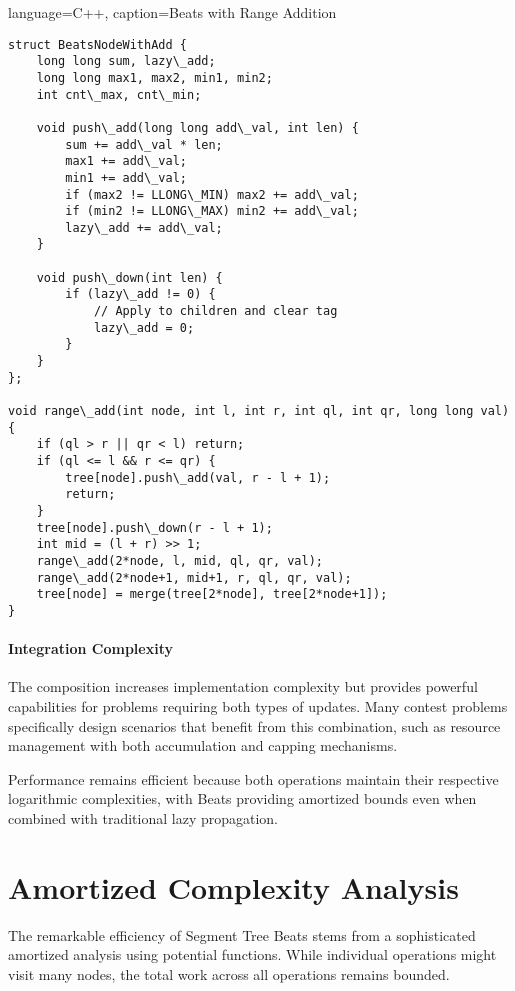 \begin{marginlisting}[0pt]{language=C++, caption=Beats with Range Addition}
\begin{lstlisting}
struct BeatsNodeWithAdd {
    long long sum, lazy\_add;
    long long max1, max2, min1, min2;
    int cnt\_max, cnt\_min;
    
    void push\_add(long long add\_val, int len) {
        sum += add\_val * len;
        max1 += add\_val;
        min1 += add\_val;
        if (max2 != LLONG\_MIN) max2 += add\_val;
        if (min2 != LLONG\_MAX) min2 += add\_val;
        lazy\_add += add\_val;
    }
    
    void push\_down(int len) {
        if (lazy\_add != 0) {
            // Apply to children and clear tag
            lazy\_add = 0;
        }
    }
};

void range\_add(int node, int l, int r, int ql, int qr, long long val) {
    if (ql > r || qr < l) return;
    if (ql <= l && r <= qr) {
        tree[node].push\_add(val, r - l + 1);
        return;
    }
    tree[node].push\_down(r - l + 1);
    int mid = (l + r) >> 1;
    range\_add(2*node, l, mid, ql, qr, val);
    range\_add(2*node+1, mid+1, r, ql, qr, val);
    tree[node] = merge(tree[2*node], tree[2*node+1]);
}
\end{lstlisting}
\end{marginlisting}

\paragraph{Integration Complexity}

The composition increases implementation complexity but provides powerful capabilities for problems requiring both types of updates. Many contest problems specifically design scenarios that benefit from this combination, such as resource management with both accumulation and capping mechanisms.

Performance remains efficient because both operations maintain their respective logarithmic complexities, with Beats providing amortized bounds even when combined with traditional lazy propagation.

\section{Amortized Complexity Analysis}
\label{sec:amortized_analysis}

The remarkable efficiency of Segment Tree Beats stems from a sophisticated amortized analysis using potential functions. While individual operations might visit many nodes, the total work across all operations remains bounded.

